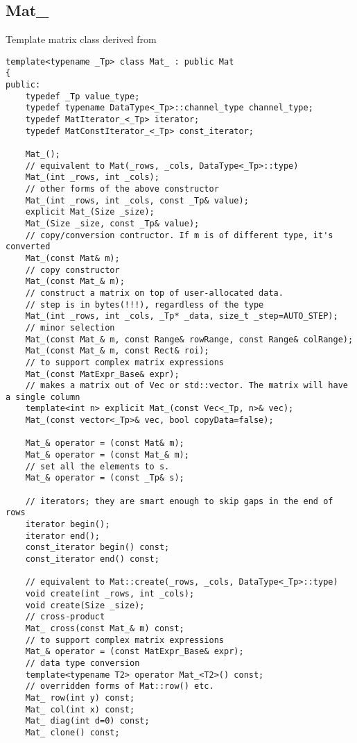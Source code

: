 \subsection{Mat\_}\label{MatT}
Template matrix class derived from 

\begin{lstlisting}
template<typename _Tp> class Mat_ : public Mat
{
public:
    typedef _Tp value_type;
    typedef typename DataType<_Tp>::channel_type channel_type;
    typedef MatIterator_<_Tp> iterator;
    typedef MatConstIterator_<_Tp> const_iterator;

    Mat_();
    // equivalent to Mat(_rows, _cols, DataType<_Tp>::type)
    Mat_(int _rows, int _cols);
    // other forms of the above constructor
    Mat_(int _rows, int _cols, const _Tp& value);
    explicit Mat_(Size _size);
    Mat_(Size _size, const _Tp& value);
    // copy/conversion contructor. If m is of different type, it's converted
    Mat_(const Mat& m);
    // copy constructor
    Mat_(const Mat_& m);
    // construct a matrix on top of user-allocated data.
    // step is in bytes(!!!), regardless of the type
    Mat_(int _rows, int _cols, _Tp* _data, size_t _step=AUTO_STEP);
    // minor selection
    Mat_(const Mat_& m, const Range& rowRange, const Range& colRange);
    Mat_(const Mat_& m, const Rect& roi);
    // to support complex matrix expressions
    Mat_(const MatExpr_Base& expr);
    // makes a matrix out of Vec or std::vector. The matrix will have a single column
    template<int n> explicit Mat_(const Vec<_Tp, n>& vec);
    Mat_(const vector<_Tp>& vec, bool copyData=false);

    Mat_& operator = (const Mat& m);
    Mat_& operator = (const Mat_& m);
    // set all the elements to s.
    Mat_& operator = (const _Tp& s);

    // iterators; they are smart enough to skip gaps in the end of rows
    iterator begin();
    iterator end();
    const_iterator begin() const;
    const_iterator end() const;

    // equivalent to Mat::create(_rows, _cols, DataType<_Tp>::type)
    void create(int _rows, int _cols);
    void create(Size _size);
    // cross-product
    Mat_ cross(const Mat_& m) const;
    // to support complex matrix expressions
    Mat_& operator = (const MatExpr_Base& expr);
    // data type conversion
    template<typename T2> operator Mat_<T2>() const;
    // overridden forms of Mat::row() etc.
    Mat_ row(int y) const;
    Mat_ col(int x) const;
    Mat_ diag(int d=0) const;
    Mat_ clone() const;


\end{lstlisting}
